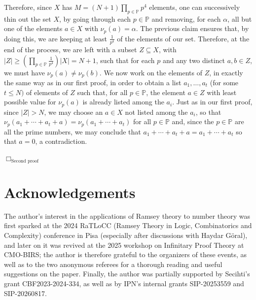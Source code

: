 \documentclass[10pt]{amsart}
\theoremstyle{definition}
\begin{document}
Therefore, since $X$ has $M=(N+1)\prod_{p\in\mathbb P}p^4$ elements, one can successively thin out the set $X$, by going through each $p\in\mathbb P$ and removing, for each $\alpha$, all but one of the elements $a\in X$ with $\nu_p(a)=\alpha$. The previous claim ensures that, by doing this, we are keeping at least $\frac{1}{p^4}$ of the elements of our set. Therefore, at the end of the process, we are left with a subset $Z\subseteq X$, with $|Z|\geq\left(\prod_{p\in\mathbb P}\frac{1}{p^4}\right)|X|=N+1$, such that for each $p$ and any two distinct $a,b\in Z$, we must have $\nu_p(a)\neq\nu_p(b)$. We now work on the elements of $Z$, in exactly the same way as in our first proof, in order to obtain a list $a_1,\ldots,a_t$ (for some $t\leq N)$ of elements of $Z$ such that, for all $p\in\mathbb P$, the element $a\in Z$ with least possible value for $\nu_p(a)$ is already listed among the $a_i$. Just as in our first proof, since $|Z|>N$, we may choose an $a\in X$ not listed among the $a_i$, so that $\nu_p(a_1+\cdots+a_t+a)=\nu_p(a_1+\cdots+a_t)$ for all $p\in\mathbb P$ and, since the $p\in\mathbb P$ are all the prime numbers, we may conclude that $a_1+\cdots+a_t+a=a_1+\cdots+a_t$ so that $a=0$, a contradiction.

\hfill$\Box_{\text{Second proof}}$

\section*{Acknowledgements}

The author's interest in the applications of Ramsey theory to number theory was first sparked at the 2024 RaTLoCC (Ramsey Theory in Logic, Combinatorics and Complexity) conference in Pisa (especially after discussions with Haydar G\"oral), and later on it was revived at the 2025 workshop on Infinitary Proof Theory at CMO-BIRS; the author is therefore grateful to the organizers of these events, as well as to the two anonymous referees for a thorough reading and useful suggestions on the paper. Finally, the author was partially supported by Secihti's grant CBF2023-2024-334, as well as by IPN's internal grants SIP-20253559 and SIP-20260817.
\end{document}
